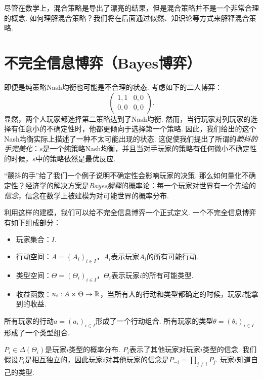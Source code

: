 尽管在数学上，混合策略是导出了漂亮的结果，但是混合策略并不是一个非常合理的概念. 如何理解混合策略？我们将在后面通过似然、知识论等方式来解释混合策略.


\section{不完全信息博弈（Bayes博弈）}

即便是纯策略Nash均衡也可能是不合理的状态. 考虑如下的二人博弈：
    \[\begin{pmatrix}
    1,1&0,0\\
    0,0&0,0
    \end{pmatrix}.\]
显然，两个人玩家都选择第二策略达到了Nash均衡. 然而，当行玩家对列玩家的选择有任意小的不确定性时，他都更倾向于选择第一个策略. 因此，我们给出的这个Nash均衡实际上描述了一种不太可能出现的状态. 这促使我们提出了所谓的\emph{颤抖的手完美化}：$s$是一个纯策略Nash均衡，并且当对手玩家的策略有任何微小不确定性的时候，$s$中的策略依然是最优反应.

“颤抖的手”给了我们一个例子说明不确定性会影响玩家的决策. 那么如何量化不确定性？经济学的解决方案是\emph{Bayes解释}的概率论：每一个玩家对世界有一个先验的\emph{信念}，信念在数学上被建模为对可能世界的概率分布.

利用这样的建模，我们可以给不完全信息博弈一个正式定义. 一个不完全信息博弈有如下组成部分：
\begin{itemize}
\item 玩家集合：$I$.
\item 行动空间：$A=(A_i)_{i\in I}$，$A_i$表示玩家$A_i$的所有可能行动.
\item 类型空间：$\Theta=(\Theta_i)_{i\in I}$，$\Theta_i$表示玩家$i$的所有可能类型.
\item 收益函数：$u_i:A\times\Theta\to\mathbb{R}$，当所有人的行动和类型都确定的时候，玩家$i$能拿到的收益.
\end{itemize}
所有玩家的行动$a=(a_i)_{i\in I}$形成了一个行动组合. 所有玩家的类型$\theta=(\theta_i)_{i\in I}$形成了一个类型组合.

 $P_i\in\Delta(\Theta_i)$是玩家$i$类型的概率分布. $P_i$表示了其他玩家对玩家$i$类型的信念. 我们假设$P_i$是相互独立的，因此玩家$i$对其他玩家的信念是$P_{-i}=\prod_{j\neq i}P_j$. 玩家$i$知道自己的类型.

